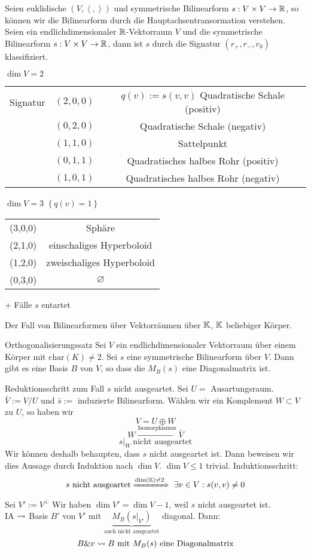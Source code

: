 Seien euklidische $(V,\left\langle , \right\rangle )$ und symmetrische Bilinearform $s:V\times V\to\mathbb{R}$, so können wir die Bilinearform durch die Hauptachsentransormation verstehen.
Seien ein endlichdimensionaler $\mathbb{R}$-Vektorraum $V$ und die symmetrische Bilinearform $s:V\times V\to\mathbb{R}$, dann ist $s$ durch die Signatur $(r_+,r_-,r_0)$ klassifiziert.
\begin{Eig}
  $\dim V=2$\\
  \begin{tabular}[htbp]{rcc}
    Signatur & $(2,0,0)$ & $q(v):=s(v,v)$ Quadratische Schale (positiv)\\
    & $(0,2,0)$ & Quadratische Schale (negativ)\\
    & $(1,1,0)$ & Sattelpunkt\\
    & $(0,1,1)$ & Quadratisches halbes Rohr (positiv)\\
    & $(1,0,1)$ & Quadratisches halbes Rohr (negativ)
  \end{tabular}
\end{Eig}
\begin{Eig}
  $\dim V=3$ $\left\{ q(v)=1 \right\}$\\
  \begin{tabular}[htbp]{cc}
    (3,0,0) & Sphäre \\
    (2,1,0) & einschaliges Hyperboloid \\
    (1,2,0) & zweischaliges Hyperboloid \\
    (0,3,0) & $\varnothing$
  \end{tabular}
  + Fälle $s$ entartet
\end{Eig}
Der Fall von Bilinearformen über Vektorräumen über $\mathbb{K}$, $\mathbb{K}$ beliebiger Körper.
\begin{Prop}{Orthogonalisierungssatz}
  Sei $V$ ein endlichdimensionaler Vektorraum über einem Körper mit $\text{char} (K)\neq 2$. Sei $s$ eine symmetrische Bilinearform über $V$. Dann gibt es eine Basis $B$ von $V$, so dass die $M_B(s)$ eine Diagonalmatrix ist.
\end{Prop}
\begin{Bew}
  Reduktionsschritt zum Fall $s$ nicht ausgeartet. Sei $U=$ Ausartungsraum. $\bar V:=V/U$ und $\bar s:=$ induzierte Bilinearform. Wählen wir ein Komplement $W\subset V$ zu $U$, so haben wir
  \[V=U\oplus W\]
  \[W\xrightarrow{\text{Isomorphismus}}\bar V\]
  \[s|_W \ \text{nicht ausgeartet}\]
  Wir können deshalb behaupten, dass $s$ nicht ausgeartet ist. Dann beweisen wir dies Aussage durch Induktion nach $\dim V$. $\dim V\leq 1$ trivial. Induktionsschritt:
  \[s\ \text{nicht ausgeartet} \xRightarrow{\dim (\mathbb{K})\neq 2}\ \exists v\in V: s(v,v)\neq 0\]
  Sei $V':=V^\perp$ Wir haben $\dim V'=\dim V-1$, weil $s$ nicht ausgeartet ist.\\
  IA $\rightsquigarrow$ Basis $B'$ von $V'$ mit $\underbrace{M_B(s|_{V'})}_{\text{auch nicht ausgeartet}}$ diagonal.
  Dann:
  \[B\& v \rightsquigarrow B \text{ mit } M_B(s) \text{ eine Diagonalmatrix}\]
\end{Bew}
